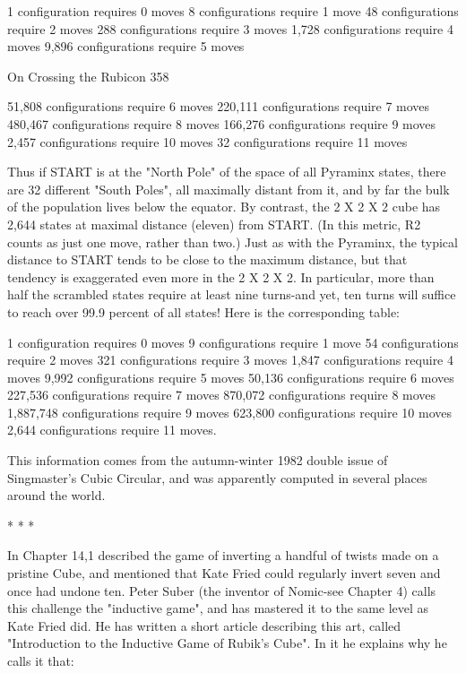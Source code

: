        1 configuration requires 0 moves
       8 configurations require 1 move
       48 configurations require 2 moves
       288 configurations require 3 moves
       1,728 configurations require 4 moves
       9,896 configurations require 5 moves




On Crossing the Rubicon                                                              358

       51,808 configurations require 6 moves
       220,111 configurations require 7 moves
       480,467 configurations require 8 moves
       166,276 configurations require 9 moves
       2,457 configurations require 10 moves
       32 configurations require 11 moves

Thus if START is at the "North Pole" of the space of all Pyraminx states, there are
32 different "South Poles", all maximally distant from it, and by far the bulk of the
population lives below the equator.
        By contrast, the 2 X 2 X 2 cube has 2,644 states at maximal distance
(eleven) from START. (In this metric, R2 counts as just one move, rather than
two.) Just as with the Pyraminx, the typical distance to START tends to be close to
the maximum distance, but that tendency is exaggerated even more in the 2 X 2 X
2. In particular, more than half the scrambled states require at least nine turns-and
yet, ten turns will suffice to reach over 99.9 percent of all states! Here is the
corresponding table:

       1 configuration requires 0 moves
       9 configurations require 1 move
       54 configurations require 2 moves
       321 configurations require 3 moves
       1,847 configurations require 4 moves
       9,992 configurations require 5 moves
       50,136 configurations require 6 moves
       227,536 configurations require 7 moves
       870,072 configurations require 8 moves
       1,887,748 configurations require 9 moves
       623,800 configurations require 10 moves
       2,644 configurations require 11 moves.

This information comes from the autumn-winter 1982 double issue of Singmaster's
Cubic Circular, and was apparently computed in several places around the world.

                                      * *    *

       In Chapter 14,1 described the game of inverting a handful of twists made
on a pristine Cube, and mentioned that Kate Fried could regularly invert seven and
once had undone ten. Peter Suber (the inventor of Nomic-see Chapter 4) calls this
challenge the "inductive game", and has mastered it to the same level as Kate Fried
did. He has written a short article describing this art, called "Introduction to the
Inductive Game of Rubik's Cube". In it he explains why he calls it that:

